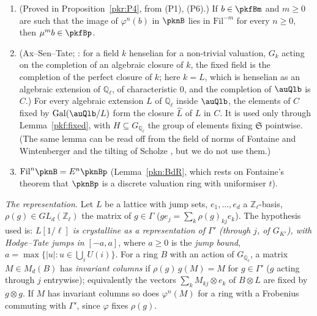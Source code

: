 \documentclass[10pt]{amsart}
\theoremstyle{definition}
\theoremstyle{remark}
\newcommand{\Z}{\mathbb Z}
\newcommand{\Q}{\mathbb Q}
\begin{document}
\begin{enumerate}
\item[(P4)] (Proved in Proposition~\ref{pkr:P4}, from (P1), (P6).) If $b\in\pkfBm$ and $m\ge0$ are such that the image of
$\varphi^n(b)$ in $\pknB$ lies in $\mathrm{Fil}^{-m}$ for every $n\ge0$, then $\mu^mb\in\pkfBp$.
\item[(P5)] (Ax--Sen--Tate; \cite[Theorem, p.~417]{pkfAx70}: for a field $k$ henselian for a non-trivial
valuation, $G_k$ acting on the completion of an algebraic closure of $k$, the fixed field is the completion of
the perfect closure of $k$; here $k=L$, which is henselian as an algebraic extension of $\Q_\ell$, of
characteristic $0$, and the completion of $\auQlb$ is $C$.) For every algebraic extension $L$ of $\Q_\ell$ inside
$\auQlb$, the elements of $C$ fixed by $\operatorname{Gal}(\auQlb/L)$ form the closure $\hat L$ of $L$ in
$C$. It is used only through Lemma~\ref{pkf:fixed}, with $H\subseteq G_{\Q_\ell}$ the group of elements
fixing $\mathfrak S$ pointwise. (The same lemma can be read off from the field of norms of Fontaine and
Wintenberger \cite{pkfWintenberger83} and the tilting of Scholze \cite{pkfScholze12}, but we do not use
them.)
\item[(P6)] $\mathrm{Fil}^n\pknB=E^n\pknBp$ (Lemma~\ref{pkn:BdR}, which rests on Fontaine's theorem
that $\pknBp$ is a discrete valuation ring with uniformiser $t$).
\end{enumerate}

\emph{The representation.} Let $L$ be a lattice with jump sets, $e_1,\dots,e_d$ a $\Z_\ell$-basis,
$\rho(g)\in GL_d(\Z_\ell)$ the matrix of $g\in\Gamma$ ($ge_j=\sum_k\rho(g)_{kj}e_k$). The hypothesis
used is: \emph{$L[1/\ell]$ is crystalline as a representation of $\Gamma'$ (through $j$, of
$G_{K'}$), with Hodge--Tate jumps in $[-a,a]$}, where $a\ge0$ is the \emph{jump bound},
$a=\max\{|u|:u\in\bigcup_iU(i)\}$. For a ring $B$ with an action of $G_{\Q_\ell}$, a matrix $M\in
M_d(B)$ has \emph{invariant columns} if $\rho(g)\,g(M)=M$ for $g\in\Gamma'$ ($g$ acting through $j$
entrywise); equivalently the vectors $\sum_kM_{kj}\otimes e_k$ of $B\otimes L$ are fixed by $g\otimes
g$. If $M$ has invariant columns so does $\varphi^n(M)$ for a ring with a Frobenius commuting with
$\Gamma'$, since $\varphi$ fixes $\rho(g)$.
\end{document}
